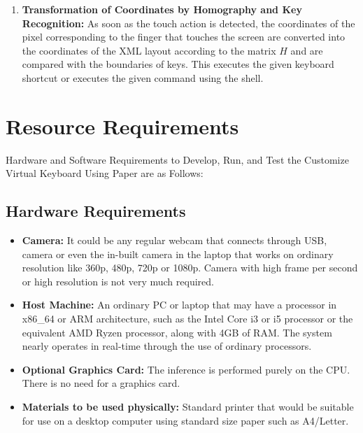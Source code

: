 \begin{enumerate}
    \item \textbf{Transformation of Coordinates by Homography and Key Recognition:} As soon as the touch action is detected, the coordinates of the pixel corresponding to the finger that touches the screen are converted into the coordinates of the XML layout according to the matrix $H$ and are compared with the boundaries of keys. This executes the given keyboard shortcut or executes the given command using the shell.
\end{enumerate}

\section{Resource Requirements}
\label{sec:resource_requirements}
Hardware and Software Requirements to Develop, Run, and Test the Customize Virtual Keyboard Using Paper are as Follows:

\subsection{Hardware Requirements}
\label{subsec:hardware_req}
\begin{itemize}
    \item \textbf{Camera:} It could be any regular webcam that connects through USB, camera or even the in-built camera in the laptop that works on ordinary resolution like 360p, 480p, 720p or 1080p. Camera with high frame per second or high resolution is not very much required.
    \item \textbf{Host Machine:} An ordinary PC or laptop that may have a processor in x86\_64 or ARM architecture, such as the Intel Core i3 or i5 processor or the equivalent AMD Ryzen processor, along with 4GB of RAM. The system nearly operates in real-time through the use of ordinary processors.
    \item \textbf{Optional Graphics Card:} The inference is performed purely on the CPU. There is no need for a graphics card.
    \item \textbf{Materials to be used physically:} Standard printer that would be suitable for use on a desktop computer using standard size paper such as A4/Letter.
\end{itemize}

